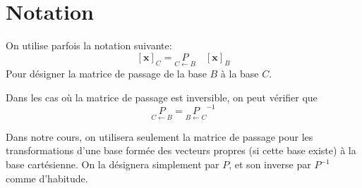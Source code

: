 \documentclass{article}
\begin{document}
\section*{Notation}
On utilise parfois la notation suivante:
\[
[\mathbf{x}]_C = \underset{\scriptscriptstyle C \leftarrow B}
P
\quad
[\mathbf{x}]_B
\]
Pour désigner la matrice de passage de la base $B$ à la base $C$.

Dans les cas où la matrice de passage est inversible, on peut vérifier que
\[
\underset{\scriptscriptstyle C \leftarrow B}
P
=
\underset{\scriptscriptstyle B \leftarrow C}
P^{-1}
\]

Dans notre cours, on utilisera seulement la matrice de passage pour les transformations d'une base formée des vecteurs propres (si cette base existe) à la base
cartésienne. On la désignera simplement par $P$, et son inverse par $P^{-1}$ comme d'habitude.
\end{document}
